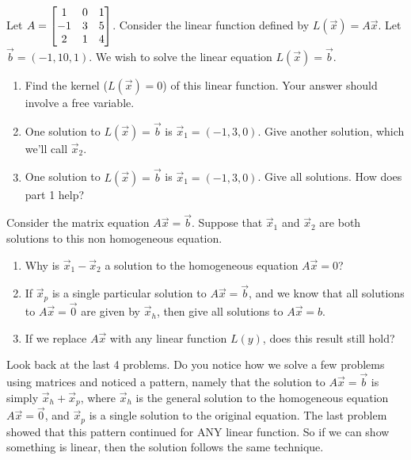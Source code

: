 \begin{problem}
Let 
$A=
\begin{bmatrix}
\begin{matrix} 1\\-1\\2 \end{matrix}&
\begin{matrix} 0\\3\\1 \end{matrix}&
\begin{matrix} 1\\5\\4 \end{matrix}
\end{bmatrix}$. Consider the linear function defined by  $L(\vec x)=A\vec x$. Let $\vec b=(-1,10,1)$.  We wish to solve the linear equation $L(\vec x)=\vec b$. 
\begin{enumerate}
 \item Find the kernel ($L(\vec x)=0$) of this linear function. Your answer should involve a free variable.
 \item One solution to $L(\vec x) = \vec b$ is $\vec x_1 = (-1,3,0)$. Give another solution, which we'll call $\vec x_2$.
 \item One solution to $L(\vec x) = \vec b$ is $\vec x_1 = (-1,3,0)$. Give all solutions.  How does part 1 help?
\end{enumerate}
\end{problem}

\begin{problem}
 Consider the matrix equation $A\vec x = \vec b$.  Suppose that $\vec x_1$ and $\vec x_2$ are both solutions to this non homogeneous equation.
\begin{enumerate}
 \item Why is $\vec x_1-\vec x_2$ a solution to the homogeneous equation $A\vec x = 0$?
 \item If $\vec x_p$ is a single particular solution to $A\vec x=\vec b$, and we know that all solutions to $A\vec x = \vec 0$ are given by $\vec x_h$, then give all solutions to $A\vec x = b$. 
 \item If we replace $A\vec x$ with any linear function $L(y)$, does this result still hold?
\end{enumerate}

\end{problem}

Look back at the last 4 problems. Do you notice how we solve a few problems using matrices and noticed a pattern, namely that the solution to $A\vec x=\vec b$ is simply $\vec x_h+\vec x_p$, where $\vec x_h$ is the general solution to the homogeneous equation $A\vec x=\vec 0$, and $\vec x_p$ is a single solution to the original equation.  The last problem showed that this pattern continued for ANY linear function. So if we can show something is linear, then the solution follows the same technique.


